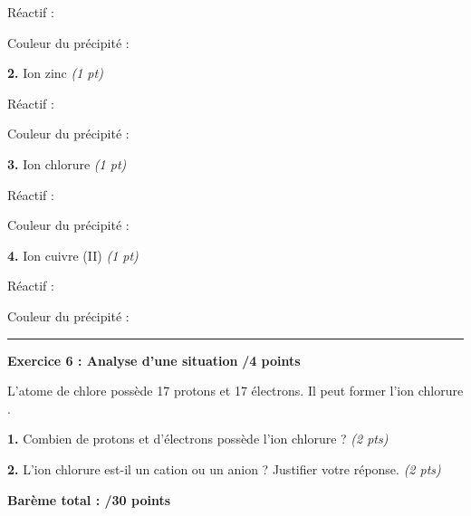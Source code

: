 \documentclass[11pt,a4paper]{article}
\newcommand{\cadreblanc}[1]{%
	\medskip\framebox[\linewidth][c]{%
		\rule{0mm}{#1mm}}\par
	\medskip}
\begin{document}
	Réactif : \dotfill
	
	Couleur du précipité : \dotfill
	
	\vspace{5mm}
	
	\textbf{2.} Ion zinc  \hfill \textit{(1 pt)}
	
	Réactif : \dotfill
	
	Couleur du précipité : \dotfill
	
	\vspace{5mm}
	
	\textbf{3.} Ion chlorure  \hfill \textit{(1 pt)}
	
	Réactif : \dotfill
	
	Couleur du précipité : \dotfill
	
	\vspace{5mm}
	
	\textbf{4.} Ion cuivre (II)  \hfill \textit{(1 pt)}
	
	Réactif : \dotfill
	
	Couleur du précipité : \dotfill
	
	\vspace{5mm}
	
	\hrule
	\vspace{3mm}
	
	\textbf{Exercice 6 : Analyse d'une situation} \hfill \textbf{/4 points}
	
	\vspace{3mm}
	
	L'atome de chlore possède 17 protons et 17 électrons. Il peut former l'ion chlorure .
	
	\vspace{3mm}
	
	\textbf{1.} Combien de protons et d'électrons possède l'ion chlorure  ? \hfill \textit{(2 pts)}
	
	\cadreblanc{10}
	
	\textbf{2.} L'ion chlorure est-il un cation ou un anion ? Justifier votre réponse. \hfill \textit{(2 pts)}
	
	\cadreblanc{10}
	
	\vfill
	
	\begin{center}
		\Large{\textbf{Barème total : /30 points}}
	\end{center}
	
\end{document}
